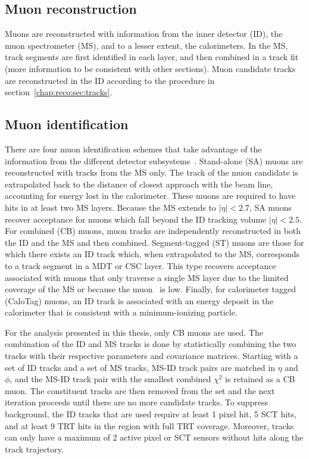 
\subsection{Muon reconstruction}

Muons are reconstructed with information from the inner detector (ID),
the muon spectrometer (MS), and to a lesser extent, the
calorimeters. In the MS, track segments are first identified in each
layer, and then combined in a track fit (more information to be
consistent with other sections). Muon candidate tracks are
reconstructed in the ID according to the procedure in
section~\ref{chap:reco:sec:tracks}.

\subsection{Muon identification}

There are four muon identification schemes that take advantage of the
information from the different detector subsystems~\cite{bib:Aad:2014rra}. Stand-alone (SA)
muons are reconstructed with tracks from the MS only. The track of the
muon candidate is extrapolated back to the distance of closest
approach with the beam line, accounting for energy lost in the
calorimeter. These muons are required to have hits in at least two MS
layers. Because the MS extends to $|\eta| < 2.7$, SA muons recover
acceptance for muons which fall beyond the ID tracking volume $|\eta|
< 2.5$. For combined (CB) muons, muon tracks are independently
reconstructed in both the ID and the MS and then
combined. Segment-tagged (ST) muons are those for which there exists
an ID track which, when extrapolated to the MS, corresponds to a track
segment in a MDT or CSC layer. This type recovers acceptance
associated with muons that only traverse a single MS layer due to the
limited coverage of the MS or because the muon \pt~is low. Finally,
for calorimeter tagged (CaloTag) muons, an ID track is associated with
an energy deposit in the calorimeter that is consistent with a
minimum-ionizing particle. 

For the analysis presented in this thesis, only CB muons are used. The
combination of the ID and MS tracks is done by statistically combining
the two tracks with their respective parameters and covariance
matrices. Starting with a set of ID tracks and a set of MS tracks,
MS-ID track pairs are matched in $\eta$ and $\phi$, and the MS-ID track
pair with the smallest combined $\chi^2$ is retained as a CB muon. The
constituent tracks are then removed from the set and the next iteration
proceeds until there are no more candidate tracks. To suppress
background, the ID tracks that are used require at least 1 pixel hit,
5 SCT hits, and at least 9 TRT hits in the region with full TRT
coverage. Moreover, tracks can only have a maximum of 2 active pixel or
SCT sensors without hits along the track trajectory.

